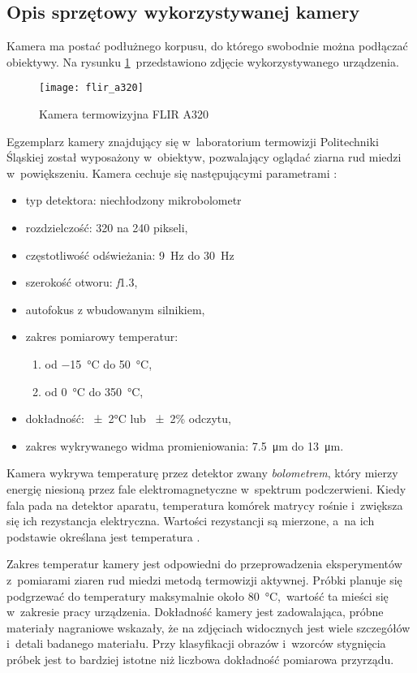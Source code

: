 \subsection{Opis sprzętowy wykorzystywanej kamery}
Kamera ma postać podłużnego korpusu, do którego swobodnie można podłączać
obiektywy.
Na rysunku \ref{fig:camera}~przedstawiono zdjęcie wykorzystywanego urządzenia.
\begin{figure}[htb]
    \centering
    \texttt{[image: flir\_a320]}
    \caption{Kamera termowizyjna FLIR A320 \cite{flir_camera_specs}}
    \label{fig:camera}
\end{figure}
Egzemplarz kamery znajdujący się w~laboratorium termowizji Politechniki Śląskiej 
został wyposażony w~obiektyw, pozwalający oglądać ziarna rud miedzi
w~powiększeniu.
Kamera cechuje się następującymi parametrami \cite{flir_camera_specs}:
\begin{itemize}
    \item typ detektora: niechłodzony mikrobolometr
    \item rozdzielczość: 320 na 240 pikseli,
    \item częstotliwość odświeżania: \SI{9}{\hertz} do \SI{30}{\hertz}
    \item szerokość otworu: \textit{f}\num{1,3},
    \item autofokus z wbudowanym silnikiem,
    \item zakres pomiarowy temperatur:
          \begin{enumerate}
              \item od \SI{-15}{\celsius} do \SI{+50}{\celsius},
              \item od \SI{0}{\celsius} do \SI{350}{\celsius},
          \end{enumerate}
    \item dokładność: \num{\pm2}\si{\celsius} lub \num{\pm2}\% odczytu,
    \item zakres wykrywanego widma promieniowania: \SI{7,5}{\micro\meter}
          do \SI{13}{\micro\meter}.
\end{itemize}

Kamera wykrywa temperaturę przez detektor zwany \emph{bolometrem}, który mierzy
energię niesioną przez fale elektromagnetyczne w~spektrum podczerwieni.
Kiedy fala pada na detektor aparatu, temperatura komórek matrycy rośnie
i~zwiększa się ich rezystancja elektryczna.
Wartości rezystancji są mierzone, a~na ich podstawie określana jest temperatura
\cite{vanhoof_infrared}.

Zakres temperatur kamery jest odpowiedni do przeprowadzenia eksperymentów
z~pomiarami ziaren rud miedzi metodą termowizji aktywnej.
Próbki planuje się podgrzewać do temperatury maksymalnie około
\SI{80}{\celsius},~wartość ta mieści się w~zakresie pracy urządzenia.
Dokładność kamery jest zadowalająca, próbne materiały nagraniowe wskazały, że na
zdjęciach widocznych jest wiele szczegółów i~detali badanego materiału.
Przy klasyfikacji obrazów i~wzorców stygnięcia próbek jest to bardziej istotne
niż liczbowa dokładność pomiarowa przyrządu.

